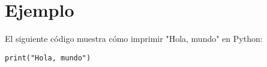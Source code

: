 \documentclass{article}
\begin{document}
\section{Ejemplo}
El siguiente código muestra cómo imprimir "Hola, mundo" en Python:
\begin{verbatim}
print("Hola, mundo")
\end{verbatim}
\end{document}

